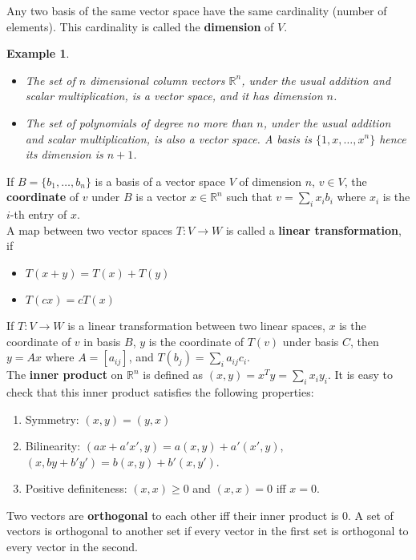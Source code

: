\documentclass{article} %
\theoremstyle{break}
\newtheorem{exa}[definition]{Example}
\begin{document}
Any two basis of the same vector space have the same cardinality (number of elements). This cardinality is called the {\bf dimension} of $V$.\\

\begin{exa}
  \begin{itemize}
  \item The set of $n$ dimensional column vectors $\mathbb{R}^n$, under the usual addition and scalar multiplication, is a vector space, and it has dimension $n$.
  \item The set of polynomials of degree no more than $n$, under the usual addition and scalar multiplication, is also a vector space. A basis is $\{1, x, \dots, x^n\}$ hence its dimension is $n+1$.
  \end{itemize}
\end{exa}


If $B=\{b_1, \dots, b_n\}$ is a basis of a vector space $V$ of dimension $n$, $v\in V$, the {\bf coordinate} of $v$ under $B$ is a vector $x\in\mathbb{R}^n$ such that $v=\sum_ix_ib_i$ where $x_i$ is the $i$-th entry of $x$.\\

A map between two vector spaces $T: V\rightarrow W$ is called a {\bf linear transformation}, if
\begin{itemize}
\item $T(x+y)=T(x)+T(y)$
\item $T(cx)=cT(x)$
\end{itemize}

If $T: V\rightarrow W$ is a linear transformation between two linear spaces, $x$ is the coordinate of $v$ in basis $B$, $y$ is the coordinate of $T(v)$ under basis $C$, then $y=Ax$ where $A=[a_{ij}]$, and $T(b_j)=\sum_ia_{ij}c_i$.\\

The {\bf inner product} on $\mathbb{R}^n$ is defined as $(x, y)=x^Ty=\sum_ix_iy_i$. It is easy to check that this inner product satisfies the following properties:
\begin{enumerate}
\item Symmetry: $(x, y)=(y, x)$
\item Bilinearity: $(ax+a'x', y)=a(x, y)+a'(x', y)$, $(x, by+b'y')=b(x, y)+b'(x, y')$.
\item Positive definiteness: $(x, x)\geq 0$ and $(x, x)=0$ iff $x=0$.
\end{enumerate}

Two vectors are {\bf orthogonal} to each other iff their inner product is $0$. A set of vectors is orthogonal to another set if every vector in the first set is orthogonal to every vector in the second.
\end{document}
